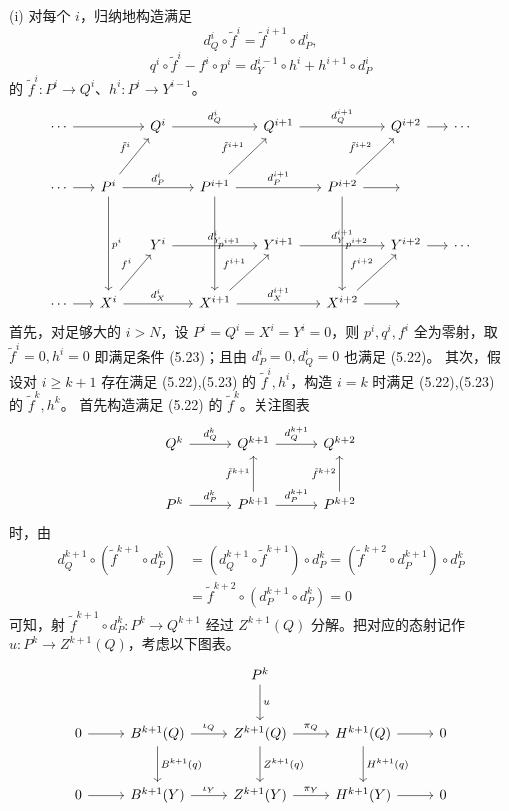 (i) 对每个 $i$，归纳地构造满足
\begin{equation}
  d_Q^i\circ\tilde f^i=\tilde f^{i+1}\circ d_P^i, \tag{5.22}
\end{equation}
\begin{equation}
  q^i\circ\tilde f^i-f^i\circ p^i=d_Y^{i-1}\circ h^i+h^{i+1}\circ d_P^i \tag{5.23}
\end{equation}
的 $\tilde f^i\colon P^i\to Q^i$、$h^i\colon P^i\to Y^{i-1}$。
\[\begin{tikzcd}[row sep=2.6em, column sep=1.5em]
\cdots \arrow[rr] & & Q^i \arrow[rr,"d_Q^i"] & & Q^{i+1} \arrow[rr,"d_Q^{i+1}"] & & Q^{i+2} \arrow[r] & \cdots \\
\cdots \arrow[r] & P^i \arrow[rr,"d_P^i"] \arrow[ur,"\tilde f^i"] \arrow[dd,"p^i"] & & P^{i+1} \arrow[rr,"d_P^{i+1}"] \arrow[ur,"\tilde f^{i+1}"] \arrow[dd,"p^{i+1}"] & & P^{i+2} \arrow[ur,"\tilde f^{i+2}"] \arrow[dd,"p^{i+2}"] \arrow[r] & {} & \\
& & Y^i \arrow[rr,"d_Y^i"] & & Y^{i+1} \arrow[rr,"d_Y^{i+1}"] & & Y^{i+2} \arrow[r] & \cdots \\
\cdots \arrow[r] & X^i \arrow[rr,"d_X^i"] \arrow[ur,"f^i"] & & X^{i+1} \arrow[rr,"d_X^{i+1}"] \arrow[ur,"f^{i+1}"] & & X^{i+2} \arrow[ur,"f^{i+2}"] \arrow[r] & {} &
\end{tikzcd}\]
首先，对足够大的 $i>N$，设 $P^i=Q^i=X^i=Y^i=0$，则 $p^i, q^i, f^i$ 全为零射，取 $\tilde f^i=0, h^i=0$ 即满足条件 (5.23)；且由 $d_P^i=0, d_Q^i=0$ 也满足 (5.22)。
其次，假设对 $i\ge k+1$ 存在满足 (5.22),(5.23) 的 $\tilde f^i, h^i$，构造 $i=k$ 时满足 (5.22),(5.23) 的 $\tilde f^k, h^k$。
首先构造满足 (5.22) 的 $\tilde f^k$。关注图表
\[\begin{tikzcd}[row sep=2.6em, column sep=3.0em]
Q^k \arrow[r,"d_Q^k"] & Q^{k+1} \arrow[r,"d_Q^{k+1}"] & Q^{k+2}\\
P^k \arrow[r,"d_P^k"] & P^{k+1} \arrow[u,"\tilde f^{k+1}"] \arrow[r,"d_P^{k+1}"] & P^{k+2} \arrow[u,"\tilde f^{k+2}"]
\end{tikzcd}\]
时，由
\begin{align*}
  d_Q^{k+1}\circ(\tilde f^{k+1}\circ d_P^k)
  &= (d_Q^{k+1}\circ\tilde f^{k+1})\circ d_P^k = (\tilde f^{k+2}\circ d_P^{k+1})\circ d_P^k\\
  &= \tilde f^{k+2}\circ(d_P^{k+1}\circ d_P^k)=0
\end{align*}
可知，射 $\tilde f^{k+1}\circ d_P^k\colon P^k\to Q^{k+1}$ 经过 $Z^{k+1}(Q)$ 分解。把对应的态射记作 $u\colon P^k\to Z^{k+1}(Q)$，考虑以下图表。
\[\begin{tikzcd}[row sep=2.6em, column sep=2.6em]
 & & P^k \arrow[d,"u"] & & \\
0 \arrow[r] & B^{k+1}(Q) \arrow[r,"\iota_Q"] \arrow[d,"B^{k+1}(q)"] & Z^{k+1}(Q) \arrow[r,"\pi_Q"] \arrow[d,"Z^{k+1}(q)"] & H^{k+1}(Q) \arrow[r] \arrow[d,"H^{k+1}(q)"] & 0\\
0 \arrow[r] & B^{k+1}(Y) \arrow[r,"\iota_Y"] & Z^{k+1}(Y) \arrow[r,"\pi_Y"] & H^{k+1}(Y) \arrow[r] & 0
\end{tikzcd}\]
